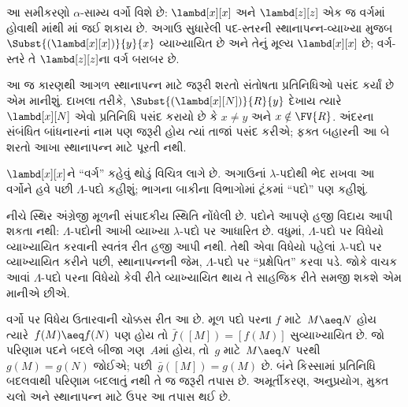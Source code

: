 આ સમીકરણો $\alpha$-સામ્ય વર્ગો વિશે છે: $\lambd[x][x]$
અને $\lambd[z][z]$ એક જ વર્ગમાં હોવાથી
માંથી માં જઈ શકાય છે. અગાઉ
સુધારેલી પદ-સ્તરની સ્થાનાપન્ન-વ્યાખ્યા મુજબ
$\Subst{(\lambd[x][x])}{y}{x}$ વ્યાખ્યાયિત છે અને
તેનું મૂલ્ય $\lambd[x][x]$ છે; વર્ગ-સ્તરે તે
$\lambd[z][z]$ના વર્ગ બરાબર છે.

આ જ કારણથી આગળ સ્થાનાપન્ન માટે જરૂરી શરતો
સંતોષતા પ્રતિનિધિઓ પસંદ કર્યાં છે એમ માનીશું. દાખલા તરીકે,
$\Subst{(\lambd[x][N])}{R}{y}$ દેખાય ત્યારે
$\lambd[x][N]$ એવો પ્રતિનિધિ પસંદ કરાયો છે કે
$x \neq y$ અને $x \notin \FV{R}$. અંદરના સંબંધિત
બાંધનારનાં નામ પણ જરૂરી હોય ત્યાં તાજાં પસંદ કરીએ; ફક્ત
બહારની આ બે શરતો આખા સ્થાનાપન્ન માટે પૂરતી નથી.

$\lambd[x][x]$ને ``વર્ગ'' કહેવું થોડું વિચિત્ર લાગે છે.
અગાઉનાં $\lambda$-પદોથી ભેદ રાખવા આ વર્ગોને હવે પછી
$\Lambda$-પદો કહીશું; ભાગના બાકીના વિભાગોમાં ટૂંકમાં
``પદો'' પણ કહીશું.

\begin{editorial}
  નીચે સ્થિર અંગ્રેજી મૂળની સંપાદકીય સ્થિતિ નોંધેલી છે.
  પદોને આપણે હજી વિદાય આપી શકતા નથી: $\Lambda$-પદોની
  આખી વ્યાખ્યા $\lambda$-પદો પર આધારિત છે. વધુમાં,
  $\Lambda$-પદો પર વિધેયો વ્યાખ્યાયિત કરવાની સ્વતંત્ર
  રીત હજી આપી નથી. તેથી એવા વિધેયો પહેલાં
  $\lambda$-પદો પર વ્યાખ્યાયિત કરીને પછી, સ્થાનાપન્નની
  જેમ, $\Lambda$-પદો પર ``પ્રક્ષેપિત'' કરવા પડે.
  જોકે વાચક આવાં $\Lambda$-પદો પરના વિધેયો કેવી રીતે વ્યાખ્યાયિત થાય તે
  સાહજિક રીતે સમજી શકશે એમ માનીએ છીએ.
\end{editorial}

વર્ગો પર વિધેય ઉતારવાની ચોક્કસ રીત આ છે. મૂળ પદો પરના
$f$ માટે~$M\aeq N$ હોય ત્યારે~$f(M)\aeq f(N)$ પણ હોય તો
$\bar f([M])=[f(M)]$ સુવ્યાખ્યાયિત છે. જો પરિણામ પદને બદલે
બીજા ગણ~$A$માં હોય, તો~$g$ માટે~$M\aeq N$ પરથી
$g(M)=g(N)$ જોઈએ; પછી~$\bar g([M])=g(M)$ છે.
બંને કિસ્સામાં પ્રતિનિધિ બદલવાથી પરિણામ બદલાતું નથી તે જ
જરૂરી તપાસ છે. અમૂર્તીકરણ, અનુપ્રયોગ, મુક્ત ચલો અને
સ્થાનાપન્ન માટે ઉપર આ તપાસ થઈ છે.
\endgroup


